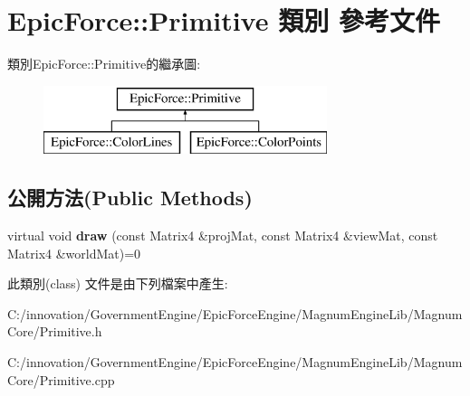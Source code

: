 \hypertarget{class_epic_force_1_1_primitive}{}\section{Epic\+Force\+:\+:Primitive 類別 參考文件}
\label{class_epic_force_1_1_primitive}
類別\+Epic\+Force\+:\+:Primitive的繼承圖\+:\begin{figure}[H]
\begin{center}
\leavevmode
\includegraphics[height=2.000000cm]{class_epic_force_1_1_primitive}
\end{center}
\end{figure}
\subsection*{公開方法(Public Methods)}
\begin{DoxyCompactItemize}
\item 
virtual void {\bfseries draw} (const Matrix4 \&proj\+Mat, const Matrix4 \&view\+Mat, const Matrix4 \&world\+Mat)=0\hypertarget{class_epic_force_1_1_primitive_a414baa373e6a25dbff1b82d3d16e4c3a}{}\label{class_epic_force_1_1_primitive_a414baa373e6a25dbff1b82d3d16e4c3a}

\end{DoxyCompactItemize}


此類別(class) 文件是由下列檔案中產生\+:\begin{DoxyCompactItemize}
\item 
C\+:/innovation/\+Government\+Engine/\+Epic\+Force\+Engine/\+Magnum\+Engine\+Lib/\+Magnum\+Core/Primitive.\+h\item 
C\+:/innovation/\+Government\+Engine/\+Epic\+Force\+Engine/\+Magnum\+Engine\+Lib/\+Magnum\+Core/Primitive.\+cpp\end{DoxyCompactItemize}
